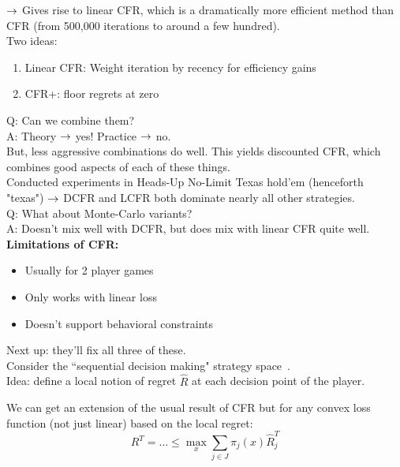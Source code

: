 $\rightarrow$ Gives rise to linear CFR, which is a dramatically more efficient method than CFR (from 500,000 iterations to around a few hundred). \\

Two ideas:
\begin{enumerate}
    \item Linear CFR: Weight iteration by recency for efficiency gains
    \item CFR+: floor regrets at zero
\end{enumerate}

Q: Can we combine them? \\

A: Theory $\rightarrow$ yes! Practice $\rightarrow$ no. \\

But, less aggressive combinations do well. This yields discounted CFR, which combines good aspects of each of these things. \\

Conducted experiments in Heads-Up No-Limit Texas hold'em (henceforth "texas") $\rightarrow$ DCFR and LCFR both dominate nearly all other strategies. \\

Q: What about Monte-Carlo variants? \\

A: Doesn't mix well with DCFR, but does mix with linear CFR quite well. \\

{\bf Limitations of CFR:}
\begin{itemize}
    \item Usually for 2 player games
    \item Only works with linear loss
    \item Doesn't support behavioral constraints
\end{itemize}
Next up: they'll fix all three of these. \\

Consider the ``sequential decision making" strategy space~\cite{farina2018online}. \\

Idea: define a local notion of regret $\hat{R}$ at each decision point of the player.

\begin{theorem}
We can get an extension of the usual result of CFR but for any convex loss function (not just linear) based on the local regret:
\[
R^T = \ldots \leq \max_x \sum_{j \in J} \pi_j(x) \hat{R}_j^T
\]
\end{theorem}

